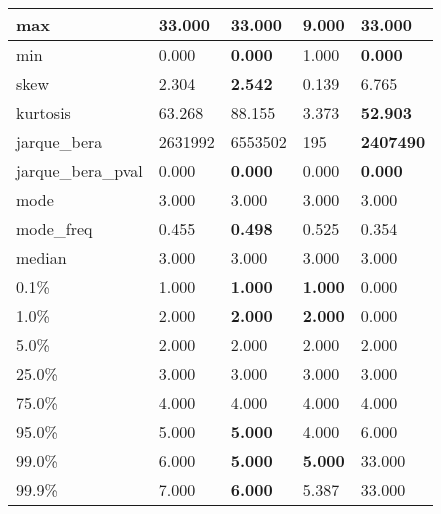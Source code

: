 \begin{table}[H]
\begin{tabular}{|l|m{10em}|m{10em}|m{10em}|m{10em}|}
\hline max & 33.000 & \bfseries 33.000 & \cellcolor[rgb]{0.9, 0.54, 0.52} 9.000 & \bfseries 33.000 \\
\hline min & 0.000 & \bfseries 0.000 & \cellcolor[rgb]{0.9, 0.54, 0.52} 1.000 & \bfseries 0.000 \\
\hline skew & 2.304 & \bfseries 2.542 & 0.139 & \cellcolor[rgb]{0.9, 0.54, 0.52} 6.765 \\
\hline kurtosis & 63.268 & 88.155 & \cellcolor[rgb]{0.9, 0.54, 0.52} 3.373 & \bfseries 52.903 \\
\hline jarque\_bera & 2631992 & \cellcolor[rgb]{0.9, 0.54, 0.52} 6553502 & 195 & \bfseries 2407490 \\
\hline jarque\_bera\_pval & 0.000 & \bfseries 0.000 & \cellcolor[rgb]{0.9, 0.54, 0.52} 0.000 & \bfseries 0.000 \\
\hline mode & 3.000 & 3.000 & 3.000 & 3.000 \\
\hline mode\_freq & 0.455 & \bfseries 0.498 & 0.525 & \cellcolor[rgb]{0.9, 0.54, 0.52} 0.354 \\
\hline median & 3.000 & 3.000 & 3.000 & 3.000 \\
\hline 0.1\% & 1.000 & \bfseries 1.000 & \bfseries 1.000 & \cellcolor[rgb]{0.9, 0.54, 0.52} 0.000 \\
\hline 1.0\% & 2.000 & \bfseries 2.000 & \bfseries 2.000 & \cellcolor[rgb]{0.9, 0.54, 0.52} 0.000 \\
\hline 5.0\% & 2.000 & 2.000 & 2.000 & 2.000 \\
\hline 25.0\% & 3.000 & 3.000 & 3.000 & 3.000 \\
\hline 75.0\% & 4.000 & 4.000 & 4.000 & 4.000 \\
\hline 95.0\% & 5.000 & \bfseries 5.000 & \cellcolor[rgb]{0.9, 0.54, 0.52} 4.000 & \cellcolor[rgb]{0.9, 0.54, 0.52} 6.000 \\
\hline 99.0\% & 6.000 & \bfseries 5.000 & \bfseries 5.000 & \cellcolor[rgb]{0.9, 0.54, 0.52} 33.000 \\
\hline 99.9\% & 7.000 & \bfseries 6.000 & 5.387 & \cellcolor[rgb]{0.9, 0.54, 0.52} 33.000 \\
\hline
\end{tabular}
\end{table}
